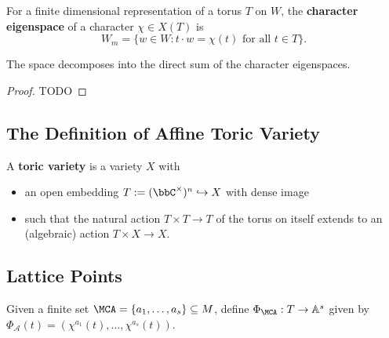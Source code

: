\begin{definition}
  \label{1-1-char-eigenspace}

  For a finite dimensional representation of a torus $T$ on $W$, the {\bf character eigenspace} of a character $\chi \in X(T)$ is
  \[
    W_m = \{w\in W : t\cdot w = \chi(t)\text{ for all } t\in T \}.
  \]
\end{definition}


\begin{proposition}
  \label{1-1-2-char-eigenspace-direct-sum}

  The space decomposes into the direct sum of the character eigenspaces.
\end{proposition}
\begin{proof}
  \uses{}

  TODO
\end{proof}

\subsection{The Definition of Affine Toric Variety}


\begin{definition}
  \label{1-1-3-aff-tor-var}
  \leanok

  A {\bf toric variety} is a variety $X$ with
  \begin{itemize}
    \item an open embedding $T := (\bbC^\times)^n \hookrightarrow X$ with dense image
    \item such that the natural action $T \times T \to T$ of the torus on itself extends to an (algebraic) action $T \times X \to X$.
  \end{itemize}
\end{definition}


\subsection{Lattice Points}


\begin{definition}
  \label{1-1-phiA}

  Given a finite set $\MCA = \{a_1, \dotsc, a_s\} \subseteq M$, define $\Phi_\MCA : T \to \mathbb{A}^s$ given by $\Phi_{\mathcal A} (t) = (\chi^{a_1} (t), \dotsc, \chi^{a_s} (t))$.
\end{definition}


